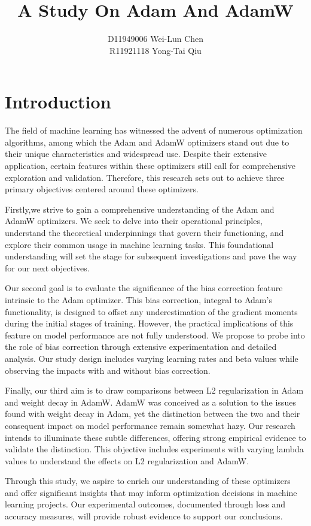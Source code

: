 \documentclass[14pt,twocolumn,letterpaper]{extarticle}
\begin{document}
\title{A Study On Adam And AdamW}
\author{D11949006 Wei-Lun Chen \\ R11921118 Yong-Tai Qiu}
\date{}
\maketitle

\section{Introduction}
The field of machine learning has witnessed the advent of numerous optimization algorithms, among which the Adam and AdamW optimizers stand out due to their unique characteristics and widespread use. Despite their extensive application, certain features within these optimizers still call for comprehensive exploration and validation. Therefore, this research sets out to achieve three primary objectives centered around these optimizers.\par
Firstly,we strive to gain a comprehensive understanding of the Adam and AdamW optimizers. We seek to delve into their operational principles, understand the theoretical underpinnings that govern their functioning, and explore their common usage in machine learning tasks. This foundational understanding will set the stage for subsequent investigations and pave the way for our next objectives.\par
Our second goal is to evaluate the significance of the bias correction feature intrinsic to the Adam optimizer. This bias correction, integral to Adam's functionality, is designed to offset any underestimation of the gradient moments during the initial stages of training. However, the practical implications of this feature on model performance are not fully understood. We propose to probe into the role of bias correction through extensive experimentation and detailed analysis. Our study design includes varying learning rates and beta values while observing the impacts with and without bias correction.\par
Finally, our third aim is to draw comparisons between L2 regularization in Adam and weight decay in AdamW. AdamW was conceived as a solution to the issues found with weight decay in Adam, yet the distinction between the two and their consequent impact on model performance remain somewhat hazy. Our research intends to illuminate these subtle differences, offering strong empirical evidence to validate the distinction. This objective includes experiments with varying lambda values to understand the effects on L2 regularization and AdamW.\par
Through this study, we aspire to enrich our understanding of these optimizers and offer significant insights that may inform optimization decisions in machine learning projects. Our experimental outcomes, documented through loss and accuracy measures, will provide robust evidence to support our conclusions.
\end{document}
